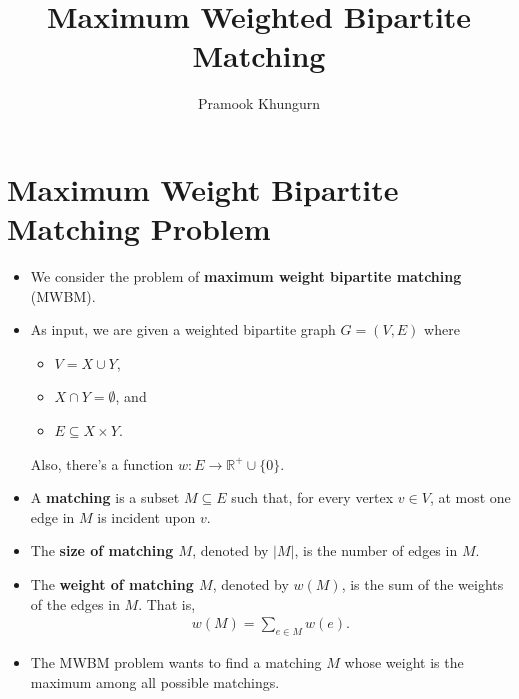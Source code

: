 \documentclass[10pt]{article}
\title{Maximum Weighted Bipartite Matching}
\author{Pramook Khungurn}
\newcommand{\ra}{\rightarrow}
\newcommand{\Real}{\mathbb{R}}
\newcommand{\sseq}{\subseteq}
\begin{document}
	\maketitle

  \section{Maximum Weight Bipartite Matching Problem}

  \begin{itemize}
    \item We consider the problem of {\bf maximum weight bipartite matching} (MWBM).

    \item As input, we are given a weighted bipartite graph $G = (V,E)$ where
    \begin{itemize}
      \item $V = X \cup Y$,
      \item $X \cap Y = \emptyset$, and
      \item $E \sseq X \times Y$.
    \end{itemize}
    Also, there's a function $w: E \ra \Real^{+} \cup \{0\}$.

    \item A {\bf matching} is a subset $M \sseq E$ such that, for every vertex $v \in V$, at most one edge in $M$ is incident upon $v$.

    \item The {\bf size of matching $M$}, denoted by $|M|$, is the number of edges in $M$.

    \item The {\bf weight of matching $M$}, denoted by $w(M)$, is the sum of the weights of the edges in $M$. That is,
    \begin{align*}
      w(M) = \sum_{e\in M} w(e).
    \end{align*}

    \item The MWBM problem wants to find a matching $M$ whose weight is the maximum among all possible matchings.
  \end{itemize}
\end{document}
